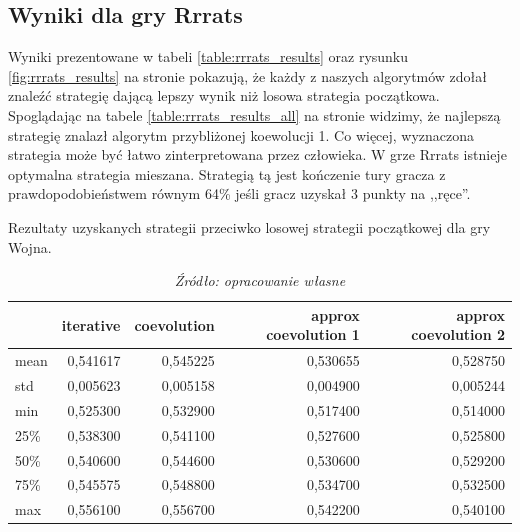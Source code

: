 \documentclass[inzynierska]{pwr_wmat_praca_dyplomowa}
\theoremstyle{plain}
\numberwithin{theorem}{chapter}
\theoremstyle{definition}
\numberwithin{theorem}{chapter}
\begin{document}
	\subsection*{Wyniki dla gry Rrrats}
	Wyniki prezentowane w tabeli \ref{table:rrrats_results} oraz rysunku \ref{fig:rrrats_results} na stronie \pageref{fig:rrrats_results} pokazują, że każdy z naszych algorytmów zdołał znaleźć strategię dającą lepszy wynik niż losowa strategia początkowa. Spoglądając na tabele \ref{table:rrrats_results_all} na stronie \pageref{table:rrrats_results_all} widzimy, że najlepszą strategię znalazł algorytm przybliżonej koewolucji 1.
	Co więcej, wyznaczona strategia może być łatwo zinterpretowana przez człowieka.
	W grze Rrrats istnieje optymalna strategia mieszana. Strategią tą jest kończenie tury gracza z prawdopodobieństwem równym 64\% jeśli gracz uzyskał 3 punkty na ,,ręce''.
	\begin{table}
		\begin{center}
			\caption{Rezultaty uzyskanych strategii przeciwko losowej strategii początkowej dla gry Wojna.}
			\small
			\begin{tabular}{lrrrr}
				\hline
				\toprule
				{} &  iterative &  coevolution &  approx coevolution 1 &  approx coevolution 2 \\
				\midrule
				mean  &    0,541617 &     0,545225 &             0,530655 &               0,528750 \\
				std   &    0,005623 &     0,005158 &             0,004900 &               0,005244 \\
				min   &    0,525300 &     0,532900 &             0,517400 &               0,514000 \\
				25\%   &    0,538300 &     0,541100 &             0,527600 &               0,525800 \\
				50\%   &    0,540600 &     0,544600 &             0,530600 &               0,529200 \\
				75\%   &    0,545575 &     0,548800 &             0,534700 &               0,532500 \\
				max   &    0,556100 &     0,556700 &             0,542200 &               0,540100 \\
				\bottomrule
				\hline
			\end{tabular}
			\caption*{\textit{Źródło: opracowanie własne}}
			\label{table:war_results}
		\end{center}
	\end{table}
\end{document}
